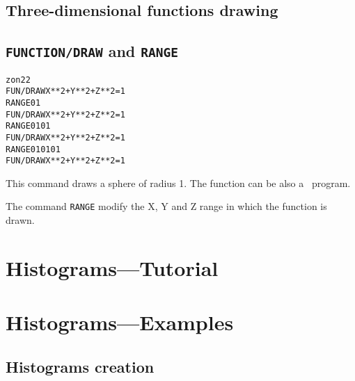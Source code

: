\subsection{Three-dimensional functions drawing}
\subsection*{{\tt FUNCTION/DRAW} and {\tt RANGE}}
\begin{alltt}
      zon 2 2
     FUN/DRAW X**2+Y**2+Z**2=1
     RANGE 0 1
     FUN/DRAW X**2+Y**2+Z**2=1
     RANGE 0 1 0 1
     FUN/DRAW X**2+Y**2+Z**2=1
     RANGE 0 1 0 1 0 1
     FUN/DRAW X**2+Y**2+Z**2=1
\end{alltt} 
\begin{DinglistE}
\item This command draws a sphere of radius 1. The function can
      be also a \COMIS\ program.
\item The command {\tt RANGE} modify the X, Y and Z range
      in which the function is drawn. 
\end{DinglistE}

\clearpage
\section{Histograms---Tutorial}
\clearpage
{}
\clearpage
{}
\clearpage
{}
\clearpage
{}
\clearpage
{}
\clearpage
{}
\clearpage
{}
\clearpage
{}
\clearpage
{}
\clearpage
{}
\clearpage
{}
\clearpage

\section{Histograms---Examples}
\subsection{Histograms creation}

